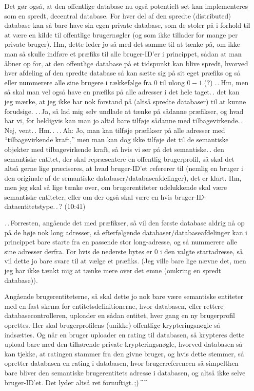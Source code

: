 \documentclass{report}
\begin{document}
Det gør også, at den offentlige database nu også potentielt set kan implementeres som en spredt, decentral database. For hver del af den spredte (distributed) database kan så bare have sin egen private database, som de stoler på i forhold til at være en kilde til offentlige brugernøgler (og som ikke tillader for mange per private bruger). Hm, dette leder jo så med det samme til at tænke på, om ikke man så skulle indføre et præfiks til alle bruger-ID'er i princippet, sådan at man åbner op for, at den offentlige database på et tidspunkt kan blive spredt, hvorved hver afdeling af den spredte database så kan sætte sig på sit eget præfiks og så eller nummerere alle sine brugere i rækkefølge fra 0 til ulong $0-1$.(?) .\,.\,Hm, men så skal man vel også have en præfiks på alle adresser i det hele taget.\,. det kan jeg mærke, at jeg ikke har nok forstand på (altså spredte databaser) til at kunne forudsige. .\,.\,Ja, så lad mig selv undlade at tænke på sådanne præfikser, og hvad har vi, for heldigvis kan man jo altid bare tilføje sådanne med tilbagevirkende.\,. Nej, vent.\,. Hm.\,. .\,.\,Ah: Jo, man kan tilføje præfikser på alle adresser med ``tilbagevirkende kraft,'' men man kan dog ikke tilføje det til de semantiske objekter med tilbagevirkende kraft, så hvis vi ser på det semantiske.\,. den semantiske entitet, der skal repræsentere en offentlig brugerprofil, så skal det altså gerne lige præciseres, at hvad bruger-ID'et refererer til (nemlig en bruger i den originale af de semantiske databaser/databaseafdelinger), det er klart. Hm, men jeg skal så lige tænke over, om brugerentiteter udelukkende skal være semantiske entiteter, eller om der også skal være en hvis bruger-ID-dataentitetstype.\,.\,? (10:41)

.\,.\,Forresten, angående det med præfikser, så vil den første database aldrig nå op på de høje nok long adresser, så efterfølgende databaser/databaseafdelinger kan i princippet bare starte fra en passende stor long-adresse, og så nummerere alle sine adresser derfra. For hvis de nederste bytes er 0 i den valgte startadresse, så vil dette jo bare svare til at vælge et præfiks. (Jeg ville bare lige nævne det, men jeg har ikke tænkt mig at tænke mere over det emne (omkring en spredt database)).

Angående brugerentiteterne, så skal dette jo nok bare være semantiske entiteter med en fast skema for entitetsdefinitionerne, hvor databasen, eller rettere databasecontrolleren, uploader en sådan entitet, hver gang en ny brugerprofil oprettes. Her skal brugerprofilens (unikke) offentlige krypteringsnøgle så indsættes. Og når en bruger uploader en rating til databasen, så krypteres dette upload bare med den tilhørende private krypteringsnøgle, hvorved databasen så kan tjekke, at ratingen stammer fra den givne bruger, og hvis dette stemmer, så opretter databasen en rating i databasen, hvor brugerreferencen så simpelthen bare bliver den semantiske brugerentitets adresse i databasen, og altså ikke selve bruger-ID'et. Det lyder altså ret fornuftigt.\,;)\,\textasciicircum\textasciicircum\ 
\end{document}
